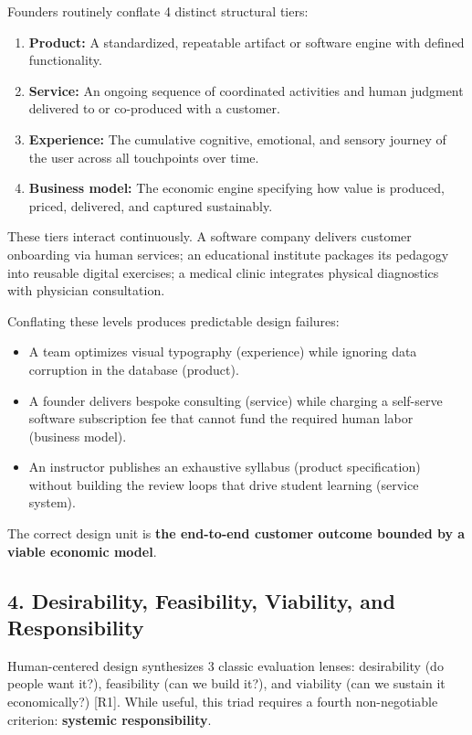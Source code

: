 Founders routinely conflate 4 distinct structural tiers:
\begin{enumerate}
    \item \textbf{Product:} A standardized, repeatable artifact or software engine with defined functionality.
    \item \textbf{Service:} An ongoing sequence of coordinated activities and human judgment delivered to or co-produced with a customer.
    \item \textbf{Experience:} The cumulative cognitive, emotional, and sensory journey of the user across all touchpoints over time.
    \item \textbf{Business model:} The economic engine specifying how value is produced, priced, delivered, and captured sustainably.
\end{enumerate}

These tiers interact continuously. A software company delivers customer onboarding via human services; an educational institute packages its pedagogy into reusable digital exercises; a medical clinic integrates physical diagnostics with physician consultation.

Conflating these levels produces predictable design failures:
\begin{itemize}
    \item A team optimizes visual typography (experience) while ignoring data corruption in the database (product).
    \item A founder delivers bespoke consulting (service) while charging a self-serve software subscription fee that cannot fund the required human labor (business model).
    \item An instructor publishes an exhaustive syllabus (product specification) without building the review loops that drive student learning (service system).
\end{itemize}

The correct design unit is \textbf{the end-to-end customer outcome bounded by a viable economic model}.

\subsection*{4. Desirability, Feasibility, Viability, and Responsibility}

Human-centered design synthesizes 3 classic evaluation lenses: desirability (do people want it?), feasibility (can we build it?), and viability (can we sustain it economically?) [R1]. While useful, this triad requires a fourth non-negotiable criterion: \textbf{systemic responsibility}.

